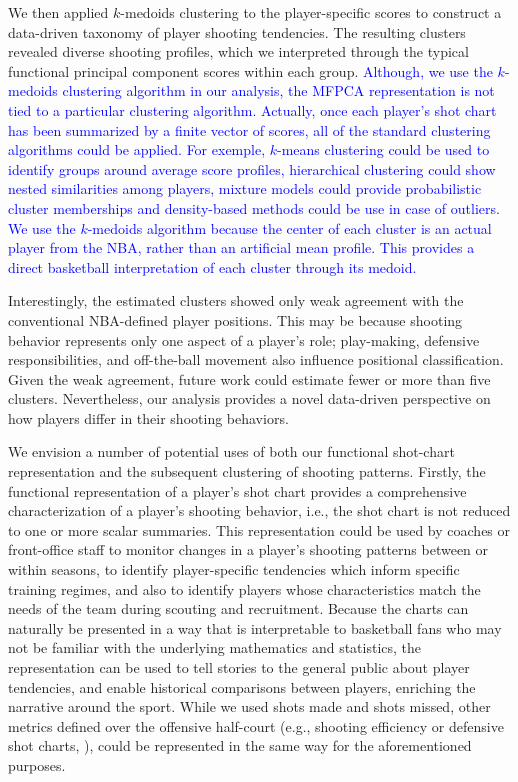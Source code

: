 \documentclass[USenglish]{article}
\theoremstyle{dgthm}
\theoremstyle{dgdef}
\begin{document}
We then applied $k$-medoids clustering to the player-specific scores to construct a data-driven taxonomy of player shooting tendencies. The resulting clusters revealed diverse shooting profiles, which we interpreted through the typical functional principal component scores within each group. \textcolor{blue}{Although, we use the $k$-medoids clustering algorithm in our analysis, the MFPCA representation is not tied to a particular clustering algorithm. Actually, once each player's shot chart has been summarized by a finite vector of scores, all of the standard clustering algorithms could be applied. For exemple, $k$-means clustering could be used to identify groups around average score profiles, hierarchical clustering could show nested similarities among players, mixture models could provide probabilistic cluster memberships and density-based methods could be use in case of outliers. We use the $k$-medoids algorithm because the center of each cluster is an actual player from the NBA, rather than an artificial mean profile. This provides a direct basketball interpretation of each cluster through its medoid.}

Interestingly, the estimated clusters showed only weak agreement with the conventional NBA-defined player positions. This may be because shooting behavior represents only one aspect of a player’s role; play-making, defensive responsibilities, and off-the-ball movement also influence positional classification.
Given the weak agreement, future work could estimate fewer or more than five clusters.
Nevertheless, our analysis provides a novel data-driven perspective on how players differ in their shooting behaviors.

We envision a number of potential uses of both our functional shot-chart representation and the subsequent clustering of shooting patterns.
Firstly, the functional representation of a player's shot chart provides a comprehensive characterization of a player's shooting behavior, i.e., the shot chart is not reduced to one or more scalar summaries.
This representation could be used by coaches or front-office staff to monitor changes in a player's shooting patterns between or within seasons, to identify player-specific tendencies which inform specific training regimes, and also to identify players whose characteristics match the needs of the team during scouting and recruitment.
Because the charts can naturally be presented in a way that is interpretable to basketball fans who may not be familiar with the underlying mathematics and statistics, the representation can be used to tell stories to the general public about player tendencies, and enable historical comparisons between players, enriching the narrative around the sport.
While we used shots made and shots missed, other metrics defined over the offensive half-court (e.g., shooting efficiency or defensive shot charts, \cite{franksCharacterizingSpatialStructure2015}), could be represented in the same way for the aforementioned purposes.
\end{document}
